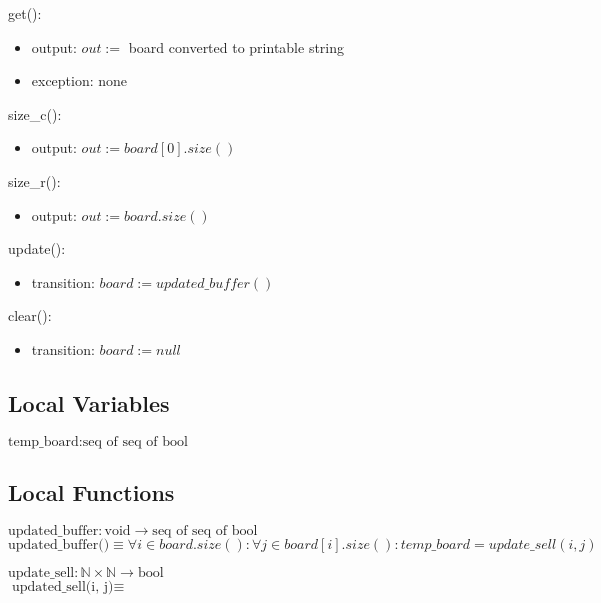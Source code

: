 \documentclass[12pt]{article}
\begin{document}
\noindent get():
\begin{itemize}
\item output: $out := $ board converted to printable string
\item exception: none
\end{itemize}

\noindent size\_c():
\begin{itemize}
\item output:  $out := board[0].size()$

\end{itemize}

\noindent size\_r():
\begin{itemize}
\item output: $out := board.size()$

\end{itemize}

\noindent update():
\begin{itemize}
\item transition: $board := updated\_buffer()$
\end{itemize}

\noindent clear():
\begin{itemize}
\item transition: $board := null$
\end{itemize}


\subsection*{Local Variables}

\noindent $\text{temp\_board} : \text{seq of seq of bool}$

\subsection*{Local Functions}

\noindent $\text{updated\_buffer} : \text{void} \rightarrow \text{seq of seq of bool}$\\
\noindent $\text{updated\_buffer()} \equiv \forall i \in board.size() : \forall j \in board[i].size() : temp\_board = update\_sell(i ,j)$

\noindent $\text{update\_sell} : \mathbb{N} \times \mathbb{N} \rightarrow \text{bool}$\\
\noindent $\text{updated\_sell(i, j)} \equiv $
\end{document}
